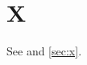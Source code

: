 \documentclass{article}
\begin{document}
\section{X}\label{sec:x}
See  and \autoref{sec:x}.
\end{document}
